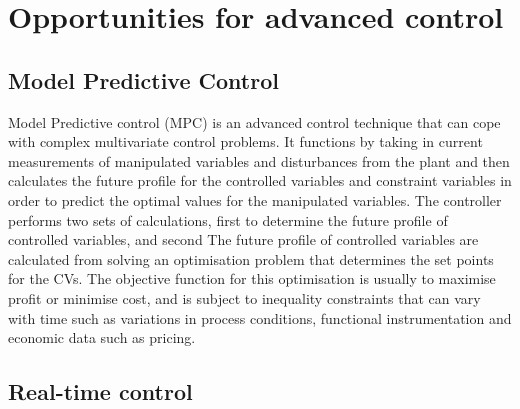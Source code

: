 \section{Opportunities for advanced control}

\subsection{Model Predictive Control}
Model Predictive control (MPC) is an advanced control technique that can cope with complex multivariate control problems. It functions by taking in current measurements of manipulated variables and disturbances from the plant and then calculates the future profile for the controlled variables and constraint variables in order to predict the optimal values for the manipulated variables. The controller performs two sets of calculations, first to determine the future profile of controlled variables, and second The future profile of controlled variables are calculated from solving an optimisation problem that determines the set points for the CVs. The objective function for this optimisation is usually to maximise profit or minimise cost, and is subject to inequality constraints that can vary with time such as variations in process conditions, functional instrumentation and economic data such as pricing. 

\subsection{Real-time control}